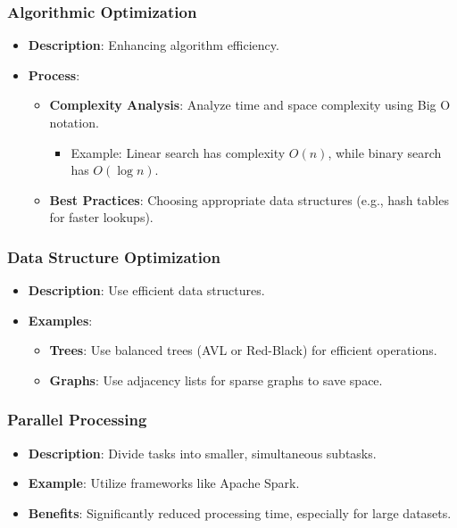 \documentclass[aspectratio=169]{beamer}
\begin{document}
\begin{frame}[fragile]
    \frametitle{Algorithmic Optimization}
    \begin{itemize}
        \item \textbf{Description}: Enhancing algorithm efficiency.
        \item \textbf{Process}:
        \begin{itemize}
            \item \textbf{Complexity Analysis}: Analyze time and space complexity using Big O notation.
            \begin{itemize}
                \item Example: Linear search has complexity $O(n)$, while binary search has $O(\log n)$.
            \end{itemize}
            \item \textbf{Best Practices}: Choosing appropriate data structures (e.g., hash tables for faster lookups).
        \end{itemize}
    \end{itemize}
\end{frame}

\begin{frame}[fragile]
    \frametitle{Data Structure Optimization}
    \begin{itemize}
        \item \textbf{Description}: Use efficient data structures.
        \item \textbf{Examples}:
        \begin{itemize}
            \item \textbf{Trees}: Use balanced trees (AVL or Red-Black) for efficient operations.
            \item \textbf{Graphs}: Use adjacency lists for sparse graphs to save space.
        \end{itemize}
    \end{itemize}
\end{frame}

\begin{frame}[fragile]
    \frametitle{Parallel Processing}
    \begin{itemize}
        \item \textbf{Description}: Divide tasks into smaller, simultaneous subtasks.
        \item \textbf{Example}: Utilize frameworks like Apache Spark.
        \item \textbf{Benefits}: Significantly reduced processing time, especially for large datasets.
    \end{itemize}
\end{frame}
\end{document}

